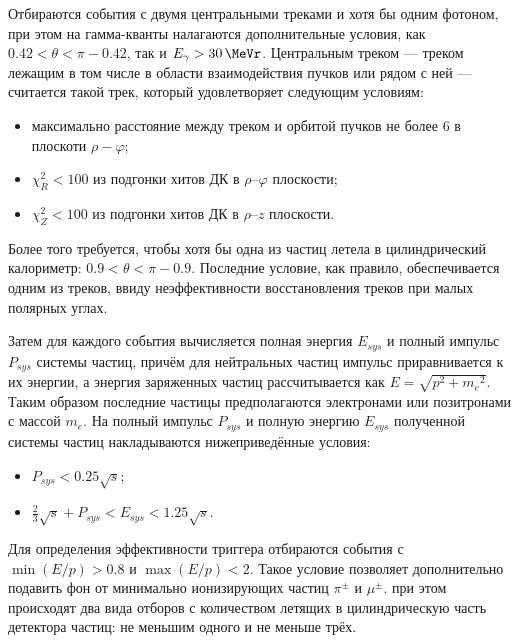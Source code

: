 Отбираются события с двумя центральными треками и хотя бы одним фотоном,
при этом на гамма-кванты налагаются дополнительные условия, 
как $0.42 < \theta < \pi - 0.42$, 
так и $E_\gamma > \SI{30}{\MeVr}$.
Центральным треком
---
треком лежащим в том числе в области взаимодействия пучков или рядом с ней
---
считается такой трек,
который удовлетворяет следующим условиям:
\begin{itemize}
	\item максимально расстояние между треком и орбитой пучков не более \SI{6}{\cmr} в плоскоти $\rho-\varphi$;
	\item $\chi^2_{R} < 100$ из подгонки хитов ДК в $\rho$--$\varphi$ плоскости;
	\item $\chi^2_{Z} < 100$ из подгонки хитов ДК в $\rho$--$z$ плоскости.
\end{itemize}
Более того требуется, чтобы хотя бы одна из частиц летела в цилиндрический калориметр:
$ 0.9 < \theta < \pi - 0.9 $.
Последние условие,
как правило,
обеспечивается одним из треков,
ввиду неэффективности восстановления треков при малых полярных углах.

Затем для каждого события вычисляется полная энергия $E_{sys}$ и полный импульс $P_{sys}$ системы частиц,
причём для нейтральных частиц импульс приравнивается к их энергии, а энергия заряженных частиц рассчитывается как $E = \sqrt{p^2 + {m_e}^2}$.
Таким образом последние частицы предполагаются электронами или позитронами с массой $m_e$.
На полный импульс $P_{sys}$ и полную энергию $E_{sys}$ полученной системы частиц накладываются нижеприведённые условия:
\begin{itemize}
    \item $P_{sys} < 0.25 \sqrt{s}$;
    \item $\frac{2}{3} \sqrt{s} + P_{sys} < E_{sys} < 1.25 \sqrt{s}$.
\end{itemize}
Для определения эффективности триггера отбираются события с $\min (E/p) > 0.8$ и $\max (E/p) < 2$.
Такое условие позволяет дополнительно подавить
фон от минимально ионизирующих частиц $\pi^\pm$ и $\mu^\pm$.
при этом происходят два вида отборов с количеством летящих в цилиндрическую часть детектора частиц:
не меньшим одного и не меньше трёх.


